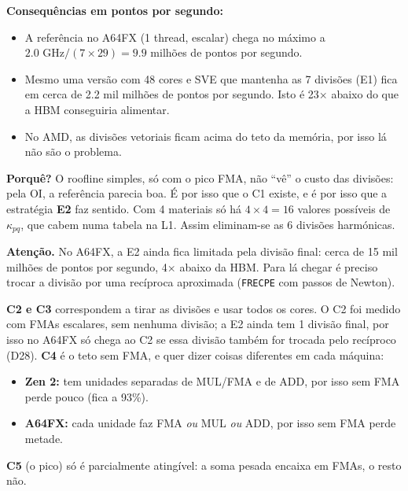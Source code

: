 \documentclass[11pt,a4paper]{article}
\newcommand{\porque}[1]{\par\noindent\colorbox{blue!6}{\parbox{\dimexpr\linewidth-2\fboxsep}{\small\textbf{Porquê?} #1}}\par}
\newcommand{\cuidado}[1]{\par\noindent\colorbox{orange!10}{\parbox{\dimexpr\linewidth-2\fboxsep}{\small\textbf{Atenção.} #1}}\par}
\begin{document}
\textbf{Consequências em pontos por segundo:}
\begin{itemize}
\item A referência no A64FX (1 thread, escalar) chega no máximo a $2.0\text{ GHz}/(7\times29) = 9.9$
milhões de pontos por segundo.
\item Mesmo uma versão com 48 cores e SVE que mantenha as 7 divisões (E1) fica em cerca de 2.2 mil
milhões de pontos por segundo. Isto é 23$\times$ abaixo do que a HBM conseguiria alimentar.
\item No AMD, as divisões vetoriais ficam acima do teto da memória, por isso lá não são o problema.
\end{itemize}
\porque{O roofline simples, só com o pico FMA, não ``vê'' o custo das divisões: pela OI, a referência
parecia boa. É por isso que o C1 existe, e é por isso que a estratégia \textbf{E2} faz sentido. Com 4
materiais só há $4\times4 = 16$ valores possíveis de $\kappa_{pq}$, que cabem numa tabela na L1. Assim
eliminam-se as 6 divisões harmónicas.}
\cuidado{No A64FX, a E2 ainda fica limitada pela divisão final: cerca de 15 mil milhões de pontos por
segundo, 4$\times$ abaixo da HBM. Para lá chegar é preciso trocar a divisão por uma recíproca aproximada
(\texttt{FRECPE} com passos de Newton).}

\textbf{C2 e C3} correspondem a tirar as divisões e usar todos os cores. O C2 foi medido com FMAs
escalares, sem nenhuma divisão; a E2 ainda tem 1 divisão final, por isso no A64FX só chega ao C2 se essa
divisão também for trocada pelo recíproco (D28). \textbf{C4} é o teto sem FMA,
e quer dizer coisas diferentes em cada máquina:
\begin{itemize}
\item \textbf{Zen 2:} tem unidades separadas de MUL/FMA e de ADD, por isso sem FMA perde pouco (fica a
93\%).
\item \textbf{A64FX:} cada unidade faz FMA \emph{ou} MUL \emph{ou} ADD, por isso sem FMA perde metade.
\end{itemize}
\textbf{C5} (o pico) só é parcialmente atingível: a soma pesada encaixa em FMAs, o resto não.
\end{document}

